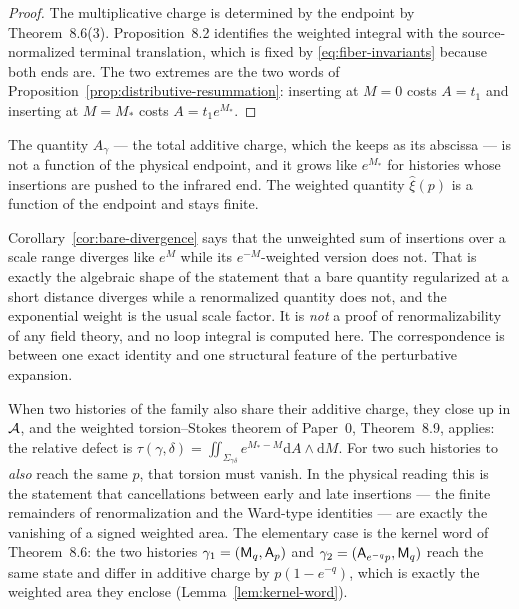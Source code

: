 \begin{proof}
The multiplicative charge is determined by the endpoint by
Theorem~8.6(3).  Proposition~8.2 identifies the weighted integral with the
source-normalized terminal translation, which is fixed by \eqref{eq:fiber-invariants}
because both ends are.  The two extremes are the two words of
Proposition~\ref{prop:distributive-resummation}: inserting at $M=0$ costs
$A=t_1$ and inserting at $M=M_*$ costs $A=t_1e^{M_*}$.
\end{proof}

\begin{corollary}
\label{cor:bare-divergence}
The quantity $A_\gamma$ --- the total additive charge, which the \ACS{} keeps as
its abscissa --- is not a function of the physical endpoint, and it grows like
$e^{M_*}$ for histories whose insertions are pushed to the infrared end.  The
weighted quantity $\hat\xi(p)$ is a function of the endpoint and stays finite.
\end{corollary}

\begin{warning}
\label{warn:divergence}
Corollary~\ref{cor:bare-divergence} says that the unweighted sum of insertions
over a scale range diverges like $e^{M}$ while its $e^{-M}$-weighted version does
not.  That is exactly the algebraic shape of the statement that a bare quantity
regularized at a short distance diverges while a renormalized quantity does not,
and the exponential weight is the usual scale factor.  It is \emph{not} a proof
of renormalizability of any field theory, and no loop integral is computed here.
The correspondence is between one exact \AEG{} identity and one structural
feature of the perturbative expansion.
\end{warning}

When two histories of the family also share their additive charge, they close up
in $\mathcal{A}$, and the weighted torsion--Stokes theorem of Paper~0, Theorem~8.9,
applies: the relative defect is
$\tau(\gamma,\delta)=\iint_{\Sigma_{\gamma\delta}}e^{M_*-M}\mathrm dA\wedge
\mathrm dM$.  For two such histories to \emph{also} reach the same $p$, that
torsion must vanish.  In the physical reading this is the statement that
cancellations between early and late insertions --- the finite remainders of
renormalization and the Ward-type identities --- are exactly the vanishing of a
signed weighted area.  The elementary case is the kernel word of
Theorem~8.6: the two histories $\gamma_1=(\mathsf M_q,\mathsf A_p)$ and
$\gamma_2=(\mathsf A_{e^{-q}p},\mathsf M_q)$ reach the same state and differ in additive
charge by $p(1-e^{-q})$, which is exactly the weighted area they enclose
(Lemma~\ref{lem:kernel-word}).


